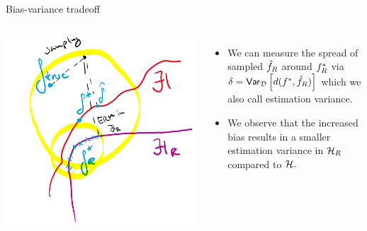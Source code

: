 \documentclass[11pt,compress,t,notes=noshow, xcolor=table]{beamer}
\begin{document}
\begin{vbframe}{Bias-variance tradeoff}
\begin{columns}[onlytextwidth,T]
  \includegraphics[width=1.0\textwidth]{figure_man/to_replace_estimation_variance_res.png}

      \lz 
      \begin{itemize}
          \item We can measure the spread of sampled $\hat{f}_R$ around $f^{\ast}_R$ via $\delta = \mathsf{Var}_{\mathcal{D}}\left[d(f^{\ast}, \hat{f}_R)\right]$ which we also call estimation variance.
          \item We observe that the increased bias results in a smaller estimation variance in $\mathcal{H}_R$ compared to $\mathcal{H}.$
      \end{itemize}
    \end{columns}

\end{vbframe}



\endlecture
\end{document}
